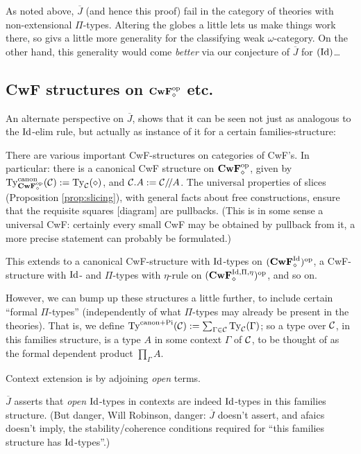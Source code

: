 \documentclass{amsart}
\newcommand{\Jbar}{\overline{J}}
\begin{document}
As noted above, $\Jbar$ (and hence this proof) fail in the category of theories with non-extensional $\Pi$-types.  Altering the globes a little lets us make things work there, so givs a little more generality for the classifying weak $\omega$-category.  On the other hand, this generality would come \emph{better} via our conjecture of $\Jbar$ for $(\mathrm{Id})$\ldots

\subsection{CwF structures on $\mathbf{CwF}_\diamond^{\mathrm{op}}$ etc.}

An alternate perspective on $\Jbar$, shows that it can be seen not just as analogous to the $\mathrm{Id}$-elim rule, but actually as instance of it for a certain families-structure:

There are various important CwF-structures on categories of CwF's. In particular: there is a canonical CwF structure on $\mathbf{CwF}_\diamond^{\mathrm{op}}$, given by $\mathrm{Ty}^\mathrm{canon}_{\mathbf{CwF}_\diamond^{\mathrm{op}}}(\mathcal{C}) := \mathrm{Ty}_{\mathcal{C}}(\diamond)$, and $\mathcal{C}.A := \mathcal{C}/\!/A$.  The universal properties of slices (Proposition \ref{prop:slicing}), with general facts about free constructions, ensure that the requisite squares [diagram] are pullbacks.  (This is in some sense a universal CwF: certainly every small CwF may be obtained by pullback from it, a more precise statement can probably be formulated.)

This extends to a canonical CwF-structure with $\mathrm{Id}$-types on $(\mathbf{CwF}^{\mathrm{Id}}_\diamond)^{\mathrm{op}}$, a CwF-structure with $\mathrm{Id}$- and $\Pi$-types with $\eta$-rule on $(\mathbf{CwF}^{\mathrm{Id},\Pi,\eta}_\diamond)^{\mathrm{op}}$, and so on.

However, we can bump up these structures a little further, to include certain ``formal $\Pi$-types'' (independently of what $\Pi$-types may already be present in the theories).  That is, we define $\mathrm{Ty}^\mathrm{canon + Pi}(\mathcal{C}) := \sum_{\Gamma \in \mathcal{C}} \mathrm{Ty}_{\mathcal{C}}(\Gamma)$; so a type over $\mathcal{C}$, in this families structure, is a type $A$ in some context $\Gamma$ of $\mathcal{C}$, to be thought of as the formal dependent product $\prod_\Gamma A$.

Context extension is by adjoining \emph{open} terms.

$\Jbar$ asserts that \emph{open} $\mathrm{Id}$-types in contexts are indeed $\mathrm{Id}$-types in this families structure.  (But danger, Will Robinson, danger: $\Jbar$ doesn't assert, and afaics doesn't imply, the stability/coherence conditions required for ``this families structure has $\mathrm{Id}$-types''.)




\end{document}
